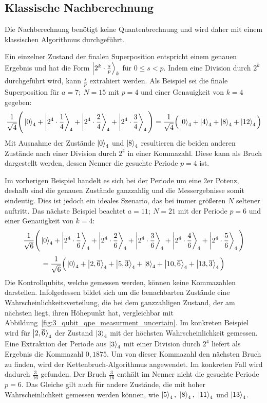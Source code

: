 \subsection{Klassische Nachberechnung} \label{Funktionsweise:klassisch}
Die Nachberechnung benötigt keine Quantenbrechnung und 
wird daher mit einem klassischen Algorithmus durchgeführt.

Ein einzelner Zustand der finalen Superposition 
entspricht einem genauen Ergebnis und hat die Form \(\ket{2^k \cdot \frac{s}{p}}_k\) für \(0 \leq s < p\).
Indem eine Division durch \(2^k\) durchgeführt wird, kann \(\frac{s}{p}\) extrahiert werden.
Als Beispiel sei die finale Superposition für \(a = 7;~N=15\) mit \(p=4\) und einer Genauigkeit von \(k=4\) gegeben:
\[\frac{1}{\sqrt{4}}
\Bigg(\ket{0}_4 +\ket{2^4 \cdot \frac{1}{4}}_4 + \ket{2^4 \cdot \frac{2}{4}}_4+\ket{2^4 \cdot \frac{3}{4}}_4
\Bigg) =
 \frac{1}{\sqrt{4}}
 \Big(\ket{0}_4 +\ket{4}_4 + \ket{8}_4+\ket{12}_4\Big) \]
Mit Ausnahme der Zustände \(\ket{0}_4\) und \(\ket{8}_4\) 
resultieren die beiden anderen Zustände nach einer Division durch \(2^4\) in einer Kommazahl. 
Diese kann als Bruch dargestellt werden, 
dessen Nenner die gesuchte Periode \(p=4\) ist.

Im vorherigen Beispiel handelt es sich bei der Periode um eine 2er Potenz, 
deshalb sind die genauen Zustände ganzzahlig und die Messergebnisse somit eindeutig.
Dies ist jedoch ein ideales Szenario, 
das bei immer größeren \(N\) seltener auftritt. 
Das nächste Beispiel beachtet \(a=11;~N=21\) mit der Periode \(p=6\) und einer Genauigkeit von \(k=4\):
\[\frac{1}{\sqrt{6}}
\Bigg(\ket{0}_4 +\ket{2^4 \cdot \frac{1}{6}}_4 + \ket{2^4 \cdot \frac{2}{6}}_4+
\ket{2^4 \cdot \frac{3}{6}}_4+\ket{2^4 \cdot \frac{4}{6}}_4 + \ket{2^4 \cdot \frac{5}{6}}_4
\Bigg) \]
\[= \frac{1}{\sqrt{6}}
\Big(\ket{0}_4 +\ket{2,\overline{6}}_4 + \ket{5,\overline{3}}_4+
\ket{8}_4+\ket{10,\overline{6}}_4 + \ket{13,\overline{3}}_4
\Big) \]
Die Kontrollqubits, welche gemessen werden, 
können keine Kommazahlen darstellen.
Infolgedessen bildet sich um die benachbarten Zustände eine Wahrscheinlichkeitsverteilung, 
die bei dem ganzzahligen Zustand, der am nächsten liegt, 
ihren Höhepunkt hat, vergleichbar mit Abbildung~\ref{fig:3_qubit_qpe_measurment_uncertain}.
Im konkreten Beispiel wird für \(\ket{2,\overline{6}}_4\) der Zustand \(\ket{3}_4\) 
mit der höchsten Wahrscheinlichkeit gemessen.
Eine Extraktion der Periode aus \(\ket{3}_4\) mit einer Division durch \(2^4\) liefert als Ergebnis die Kommazahl \(0,1875\).
Um von dieser Kommazahl den nächsten Bruch zu finden, wird der Kettenbruch-Algorithmus angewendet.
Im konkreten Fall wird dadurch \(\frac{3}{16}\) gefunden.
Der Bruch \(\frac{3}{16}\) enthält im Nenner nicht die gesuchte Periode \(p=6\). 
Das Gleiche gilt auch für andere Zustände, 
die mit hoher Wahrscheinlichkeit gemessen werden können, wie 
\(\ket{5}_4,~\ket{8}_4,~\ket{11}_4\) und \(\ket{13}_4\).

